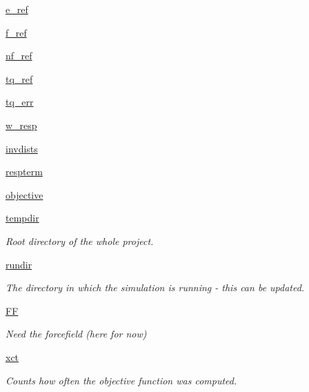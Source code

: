 \begin{DoxyCompactItemize}
\hyperlink{classforcebalance_1_1abinitio_1_1AbInitio_a71d13d3fabd98146c68bb5fc784f6732}{e\-\_\-ref}
\item 
\hyperlink{classforcebalance_1_1abinitio_1_1AbInitio_a6631ee11ee5646d97ea0fa5c9b22fc6a}{f\-\_\-ref}
\item 
\hyperlink{classforcebalance_1_1abinitio_1_1AbInitio_a5a77f4b99a5b01245ab0435d632122a1}{nf\-\_\-ref}
\item 
\hyperlink{classforcebalance_1_1abinitio_1_1AbInitio_aadda7244869b583a4533317615c421e1}{tq\-\_\-ref}
\item 
\hyperlink{classforcebalance_1_1abinitio_1_1AbInitio_ae60e834d5b5bf13f8fb70d403a97db28}{tq\-\_\-err}
\item 
\hyperlink{classforcebalance_1_1abinitio_1_1AbInitio_a176a442bd340d2f9b54319e76feb46ae}{w\-\_\-resp}
\item 
\hyperlink{classforcebalance_1_1abinitio_1_1AbInitio_aa01ee600ba0f429ffc81135af9d8109b}{invdists}
\item 
\hyperlink{classforcebalance_1_1abinitio_1_1AbInitio_a689e3849518b33539442a473a41ed32d}{respterm}
\item 
\hyperlink{classforcebalance_1_1abinitio_1_1AbInitio_acbbd447b9f66bc4699992f3b64bb256d}{objective}
\item 
\hyperlink{classforcebalance_1_1target_1_1Target_aa1f01b5b78db253b5b66384ed11ed193}{tempdir}
\begin{DoxyCompactList}\small\item\em Root directory of the whole project. \end{DoxyCompactList}\item 
\hyperlink{classforcebalance_1_1target_1_1Target_a6872de5b2d4273b82336ea5b0da29c9e}{rundir}
\begin{DoxyCompactList}\small\item\em The directory in which the simulation is running -\/ this can be updated. \end{DoxyCompactList}\item 
\hyperlink{classforcebalance_1_1target_1_1Target_a38a37919783141ea37fdcf8b00ce0aaf}{F\-F}
\begin{DoxyCompactList}\small\item\em Need the forcefield (here for now) \end{DoxyCompactList}\item 
\hyperlink{classforcebalance_1_1target_1_1Target_aad2e385cfbf7b4a68f1c2cb41133fe82}{xct}
\begin{DoxyCompactList}\small\item\em Counts how often the objective function was computed. \end{DoxyCompactList}\item 

\end{DoxyCompactItemize}
